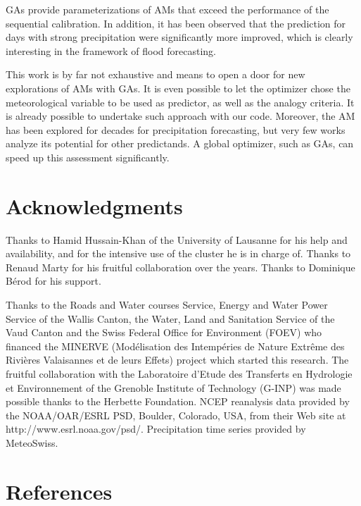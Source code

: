 \documentclass[review]{elsarticle}
\begin{document}
GAs provide parameterizations of AMs that exceed the performance of the sequential calibration. In addition, it has been observed that the prediction for days with strong precipitation were significantly more improved, which is clearly interesting in the framework of flood forecasting.

This work is by far not exhaustive and means to open a door for new explorations of AMs with GAs. It is even possible to let the optimizer chose the meteorological variable to be used as predictor, as well as the analogy criteria. It is already possible to undertake such approach with our code. Moreover, the AM has been explored for decades for precipitation forecasting, but very few works analyze its potential for other predictands. A global optimizer, such as GAs, can speed up this assessment significantly.


\section*{Acknowledgments}
Thanks to Hamid Hussain-Khan of the University of Lausanne for his help and availability, and for the intensive use of the cluster he is in charge of. Thanks to Renaud Marty for his fruitful collaboration over the years. Thanks to Dominique B\'{e}rod for his support.

Thanks to the Roads and Water courses Service, Energy and Water Power Service of the Wallis Canton, the Water, Land and Sanitation Service of the Vaud Canton and the Swiss Federal Office for Environment (FOEV) who financed the MINERVE (Mod\'{e}lisation des Intemp\'{e}ries de Nature Extr\^{e}me des Rivi\`{e}res Valaisannes et de leurs Effets) project which started this research. The fruitful collaboration with the Laboratoire d'Etude des Transferts en Hydrologie et Environnement of the Grenoble Institute of Technology (G-INP) was made possible thanks to the Herbette Foundation. NCEP reanalysis data provided by the NOAA/OAR/ESRL PSD, Boulder, Colorado, USA, from their Web site at http://www.esrl.noaa.gov/psd/. Precipitation time series provided by MeteoSwiss. 


\section*{References}



\clearpage

\end{document}
